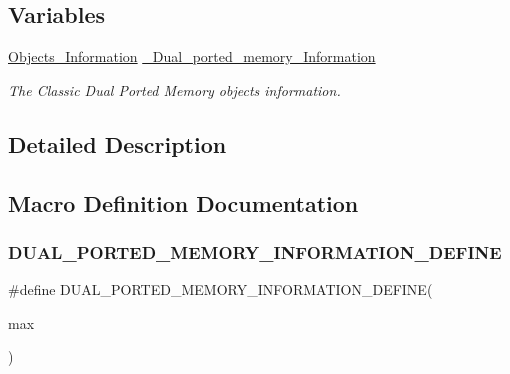 \subsection*{Variables}
\begin{DoxyCompactItemize}
\item 
\mbox{\label{group__ClassicDPMEMImpl_ga8eda2b092ff5446be98e5f2868a73e9c}} 
\mbox{\hyperlink{structObjects__Information}{Objects\+\_\+\+Information}} \mbox{\hyperlink{group__ClassicDPMEMImpl_ga8eda2b092ff5446be98e5f2868a73e9c}{\+\_\+\+Dual\+\_\+ported\+\_\+memory\+\_\+\+Information}}
\begin{DoxyCompactList}\small\item\em The Classic Dual Ported Memory objects information. \end{DoxyCompactList}\end{DoxyCompactItemize}


\subsection{Detailed Description}


\subsection{Macro Definition Documentation}
\mbox{\label{group__ClassicDPMEMImpl_ga9dd577ed3847bfc0a6c91f9758d0bf43}} 
\subsubsection{\texorpdfstring{DUAL\_PORTED\_MEMORY\_INFORMATION\_DEFINE}{DUAL\_PORTED\_MEMORY\_INFORMATION\_DEFINE}}
{\footnotesize\ttfamily \#define D\+U\+A\+L\+\_\+\+P\+O\+R\+T\+E\+D\+\_\+\+M\+E\+M\+O\+R\+Y\+\_\+\+I\+N\+F\+O\+R\+M\+A\+T\+I\+O\+N\+\_\+\+D\+E\+F\+I\+NE(\begin{DoxyParamCaption}\item[{}]{max }\end{DoxyParamCaption})}

